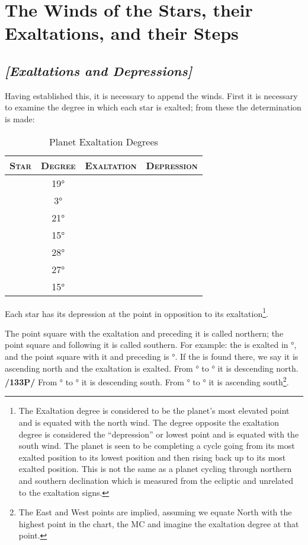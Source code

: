 \section{The Winds of the Stars, their Exaltations, and their Steps}
\subsection{\textit{[Exaltations and Depressions]}}
Having established this, it is necessary to append the winds. First it is necessary to examine the  degree in which each star is exalted; from these the determination is made:

\begin{table}[h]
\caption{Planet Exaltation Degrees}
\vspace{-1em}
\begin{center}
\begin{tabular}{cccc}
\toprule
\textsc{Star} & \textsc{Degree} 
	& \textsc{Exaltation} & \textsc{Depression} \\
\midrule
\Sun 		& 19°		& \Aries 			& \Libra			\\
\Moon		&   3° 		& \Taurus			& \Scorpio  		\\
\Saturn		& 21°		& \Libra			& \Aries			\\
\Jupiter		& 15°		& \Cancer			& \Capricorn		\\
\Mars		& 28°		& \Capricorn		& \Cancer 		\\
\Venus		& 27°		& \Pisces			& \Virgo 			\\
\Mercury	& 15°		& \Virgo			& \Pisces			\\
\bottomrule
\end{tabular}
\end{center}
\end{table}
\vspace{-1em}
Each star has its depression at the point in opposition to its exaltation\footnote{The Exaltation degree  is considered to be the planet's most elevated point and is equated with the north wind. The degree opposite the exaltation degree is considered the ``depression'' or lowest point and is equated with the south wind. The planet is seen to be completing a cycle going from its most exalted position to its lowest position and then rising back up to its most exalted position. This is not the same as a planet cycling through northern and southern declination which is measured from the ecliptic and unrelated to the exaltation signs.}.

The point square with the exaltation and preceding it is called northern; the point square and following it is called southern. For example: the \Sun\xspace is exalted in °, and the point square with it and preceding is °. If the \Sun\xspace is found there, we say it is ascending north and the exaltation is exalted. From \Aries\xspace 19° to \Cancer\xspace 19° it is descending north. \textbf{/133P/} From \Cancer\xspace 19° to \Libra\xspace 19° it is descending south. From \Libra\xspace 19° to \Capricorn\xspace 19° it is ascending south\footnote{The East and West points are implied, assuming we equate North with the highest point in the chart, the MC and imagine the exaltation degree at that point.}.

